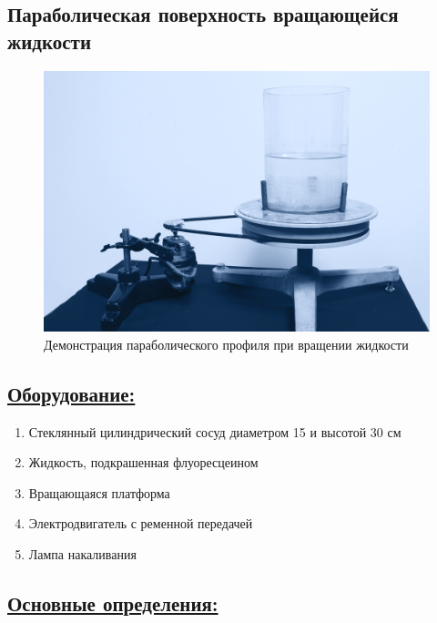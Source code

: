 \documentclass[14pt,a4paper,oneside]{extarticle}	%
\begin{document}

\begin{center}
	\subsection*{Параболическая поверхность вращающейся жидкости}
\end{center}

\begin{figure}[H]
	\centering 	
	\includegraphics[width=0.9\linewidth]{paraboloid-1.png}
	\caption{Демонстрация параболического профиля при вращении жидкости}
	\label{paraboloid-1}
\end{figure}

\subsection*{\underline{Оборудование:}}

\begin{enumerate}
	\item Стеклянный цилиндрический сосуд диаметром 15 и высотой 30 см
	\item Жидкость, подкрашенная флуоресцеином
	\item Вращающаяся платформа
	\item Электродвигатель с ременной передачей
	\item Лампа накаливания
\end{enumerate}

\newpage
\subsection*{\underline{Основные определения:}}
\end{document}
